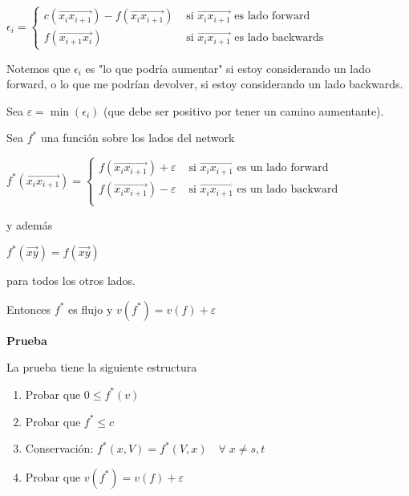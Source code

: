 \documentclass[10pt,a4paper]{article}
\begin{document}
\begin{center}
$\epsilon_i = \begin{cases} c(\overrightarrow{x_ix_{i+1}}) - f(\overrightarrow{x_ix_{i+1}}) & \text{ si } \overrightarrow{x_ix_{i+1}} \text{ es lado forward}\\ f(\overrightarrow{x_{i+1}x_i}) &\text{ si } \overrightarrow{x_ix_{i+1}} \text{ es lado backwards} \end{cases}$
\end{center}

Notemos que $\epsilon_i$ es "lo que podría aumentar" si estoy considerando un lado forward, o lo que me podrían devolver, si estoy considerando un lado backwards.

Sea $\varepsilon = \min(\epsilon_i)$ (que debe ser positivo por tener un camino aumentante).

Sea $f^*$ una función sobre los lados del network

\begin{center}
$f^*(\overrightarrow{x_ix_{i+1}}) = \begin{cases} f(\overrightarrow{x_ix_{i+1}}) + \varepsilon & \text{ si }\overrightarrow{x_ix_{i+1}} \text{ es un lado forward}\\ f(\overrightarrow{x_ix_{i+1}}) - \varepsilon & \text{ si }\overrightarrow{x_ix_{i+1}} \text{ es un lado backward}\\ \end{cases} $
\end{center}

y además

\begin{center}
$f^*(\overrightarrow{xy}) = f(\overrightarrow{xy})$
\end{center}

para todos los otros lados.

Entonces $f^*$ es flujo y $v(f^*) = v(f)+\varepsilon$

\textbf{Prueba}

La prueba tiene la siguiente estructura

\begin{enumerate}

	\item Probar que $0 \leq f^* (v)$
	\item Probar que $f^* \leq c$
	\item Conservación: $f^*(x, V) = f^*(V, x) \quad\forall\; x\neq s, t$
	\item Probar que $v(f^*) = v(f)+\varepsilon$
\end{enumerate}
\end{document}
